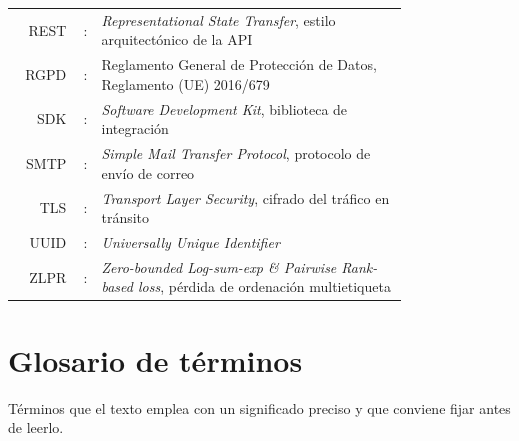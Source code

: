 \begin{tabular}{r r p{0.78\linewidth}}
REST  & : & \emph{Representational State Transfer}, estilo arquitectónico de la API \\
RGPD  & : & Reglamento General de Protección de Datos, Reglamento (UE) 2016/679 \\
SDK   & : & \emph{Software Development Kit}, biblioteca de integración \\
SMTP  & : & \emph{Simple Mail Transfer Protocol}, protocolo de envío de correo \\
TLS   & : & \emph{Transport Layer Security}, cifrado del tráfico en tránsito \\
UUID  & : & \emph{Universally Unique Identifier} \\
ZLPR  & : & \emph{Zero-bounded Log-sum-exp \& Pairwise Rank-based loss}, pérdida de ordenación multietiqueta \\
\end{tabular}

\section*{Glosario de términos}

Términos que el texto emplea con un significado preciso y que conviene fijar antes de leerlo.

